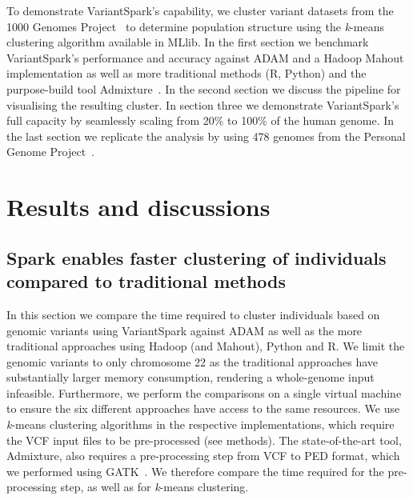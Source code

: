 \documentclass{bmcart}
\newcommand{\variantSpark}{{\sc VariantSpark}}
\newcommand{\kMeans}{\textit{k}-means}
\begin{document}
To demonstrate \variantSpark's capability, we cluster variant datasets from the 1000 Genomes Project~\cite{1KG2012} to determine population structure using the \kMeans{} clustering algorithm available in MLlib. 
In the first section we benchmark \variantSpark's performance and accuracy against {\sc ADAM} and a Hadoop Mahout implementation as well as more traditional methods (R, Python) and the purpose-build tool {\sc Admixture}~\cite{Alexander2009}. %
In the second section we discuss the pipeline for visualising the resulting cluster.
In section three we demonstrate \variantSpark's full capacity by seamlessly scaling from 20\% to 100\% of the human genome.
In the last section we replicate the analysis by using 478 genomes from the Personal Genome Project~\cite{Lunshof2013}.


\section*{Results and discussions}

\subsection*{{\sc Spark} enables faster clustering of individuals compared to traditional methods}

In this section we compare the time required to cluster individuals based on genomic variants using \variantSpark{} against {\sc ADAM} as well as the more traditional approaches using Hadoop (and Mahout), Python and R. 
We limit the genomic variants to only chromosome 22 as the traditional approaches have substantially larger memory consumption, rendering a whole-genome input infeasible.
Furthermore, we perform the comparisons on a single virtual machine to ensure the six different approaches have access to the same resources.
We use \kMeans{} clustering algorithms in the respective implementations, which require the VCF input files to be pre-processed (see methods). 
The state-of-the-art tool, {\sc Admixture}, also requires a pre-processing step from VCF to PED format, which we performed using GATK~\cite{McKenna2010}.
We therefore compare the time required for the pre-processing step, as well as for \kMeans{} clustering.
\end{document}

